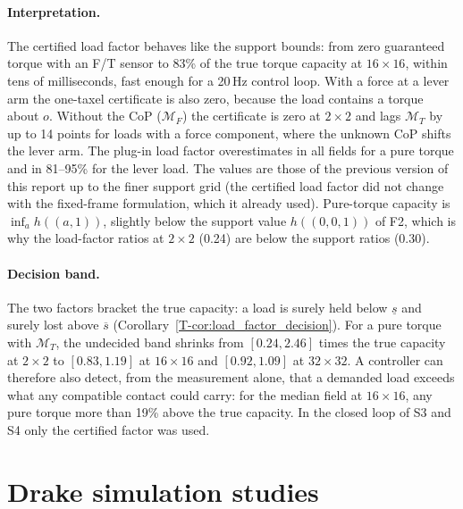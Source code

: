 \documentclass[11pt,a4paper]{article}
\newcommand{\M}{\mathcal M}
\newcommand{\T}[1]{\ref{T-#1}}                       %
\begin{document}
\paragraph{Interpretation.} The certified load factor behaves like the support bounds: from zero guaranteed torque with an F/T sensor to 83\% of the true
torque capacity at $16\times16$, within tens of milliseconds, fast enough for a 20\,Hz control loop. With a force at a lever arm the one-taxel
certificate is also zero, because the load contains a torque about $o$. Without the CoP ($\M_F$) the certificate is zero at $2\times2$ and lags $\M_T$
by up to 14 points for loads with a force component, where the unknown CoP shifts the lever arm. The plug-in load factor overestimates in all
fields for a pure torque and in 81--95\% for the lever load. The values are those of the previous version of this report up to the finer support
grid (the certified load factor did not change with the fixed-frame formulation, which it already used). Pure-torque capacity is $\inf_ah((a,1))$, slightly below the support value
$h((0,0,1))$ of F2, which is why the load-factor ratios at $2\times2$ (0.24) are below the support ratios (0.30).
\paragraph{Decision band.} The two factors bracket the true capacity: a load is surely held below $\underline s$ and surely lost above $\overline s$
(Corollary~\T{cor:load_factor_decision}). For a pure torque with $\M_T$, the undecided band shrinks from $[0.24,2.46]$ times the true capacity at
$2\times2$ to $[0.83,1.19]$ at $16\times16$ and $[0.92,1.09]$ at $32\times32$. A controller can therefore also detect, from the measurement alone, that a
demanded load exceeds what any compatible contact could carry: for the median field at $16\times16$, any pure torque more than 19\% above the true
capacity. In the closed loop of S3 and S4
only the certified factor was used.

\section{Drake simulation studies}
\label{sec:drake}
\end{document}
